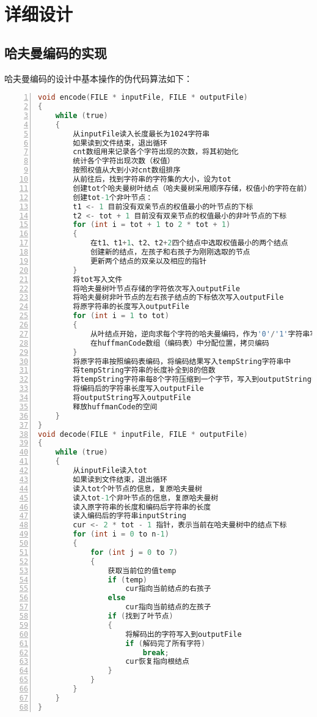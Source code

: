 \documentclass{article}
\begin{document}
\section{详细设计}

\subsection{哈夫曼编码的实现}

哈夫曼编码的设计中基本操作的伪代码算法如下：

\begin{lstlisting}[language={C},
    numbers=left,
    numberstyle=\tiny\consolas,
    basicstyle=\small\consolas]
void encode(FILE * inputFile, FILE * outputFile)
{
    while (true)
    {
        从inputFile读入长度最长为1024字符串
        如果读到文件结束，退出循环
        cnt数组用来记录各个字符出现的次数，将其初始化
        统计各个字符出现次数（权值）
        按照权值从大到小对cnt数组排序
        从前往后，找到字符串的字符集的大小，设为tot
        创建tot个哈夫曼树叶结点（哈夫曼树采用顺序存储，权值小的字符在前）
        创建tot-1个非叶节点：
        t1 <- 1 目前没有双亲节点的权值最小的叶节点的下标
        t2 <- tot + 1 目前没有双亲节点的权值最小的非叶节点的下标
        for (int i = tot + 1 to 2 * tot + 1)
        {
            在t1、t1+1、t2、t2+2四个结点中选取权值最小的两个结点
            创建新的结点，左孩子和右孩子为刚刚选取的节点
            更新两个结点的双亲以及相应的指针
        }
        将tot写入文件
        将哈夫曼树叶节点存储的字符依次写入outputFile
        将哈夫曼树非叶节点的左右孩子结点的下标依次写入outputFile
        将原字符串的长度写入outputFile
        for (int i = 1 to tot)
        {
            从叶结点开始，逆向求每个字符的哈夫曼编码，作为'0'/'1'字符串写入tempString
            在huffmanCode数组（编码表）中分配位置，拷贝编码
        }
        将原字符串按照编码表编码，将编码结果写入tempString字符串中
        将tempString字符串的长度补全到8的倍数
        将tempString字符串每8个字符压缩到一个字节，写入到outputString中
        将编码后的字符串长度写入outputFile
        将outputString写入outputFile
        释放huffmanCode的空间
    }
}
void decode(FILE * inputFile, FILE * outputFile)
{
    while (true)
    {
        从inputFile读入tot
        如果读到文件结束，退出循环
        读入tot个叶节点的信息，复原哈夫曼树
        读入tot-1个非叶节点的信息，复原哈夫曼树
        读入原字符串的长度和编码后字符串的长度
        读入编码后的字符串inputString
        cur <- 2 * tot - 1 指针，表示当前在哈夫曼树中的结点下标
        for (int i = 0 to n-1)
        {
            for (int j = 0 to 7)
            {
                获取当前位的值temp
                if (temp)
                    cur指向当前结点的右孩子
                else
                    cur指向当前结点的左孩子
                if (找到了叶节点)
                {
                    将解码出的字符写入到outputFile
                    if (解码完了所有字符)
                        break;
                    cur恢复指向根结点
                }
            }
        }
    }
}
\end{lstlisting}
\end{document}
